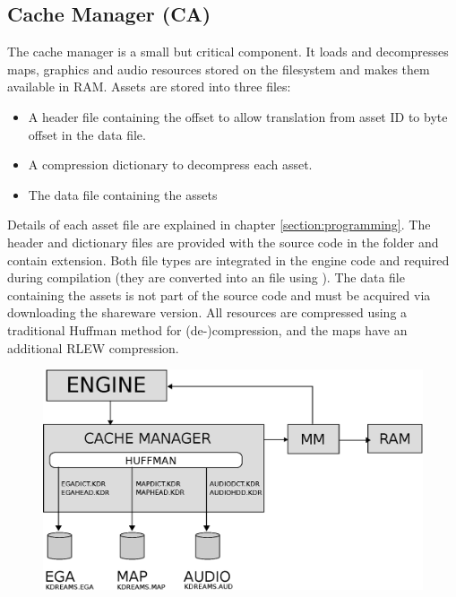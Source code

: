 \documentclass[book.tex]{subfiles}
\begin{document}
\pagebreak

\subsection{Cache Manager (CA)}
The cache manager is a small but critical component. It loads and decompresses maps, graphics and audio resources stored on the filesystem and makes them available in RAM. Assets are stored into three files: 
\begin{itemize}
	\item A header file containing the offset to allow translation from asset ID to byte offset in the data file.
	\item A compression dictionary to decompress each asset.
	\item The data file containing the assets
\end{itemize}
 \par
 
Details of each asset file are explained in chapter \ref{section:programming}. The header and dictionary files are provided with the source code in the  folder and contain  extension. Both file types are integrated in the engine code and required during compilation (they are converted into an  file using ). The data file containing the assets is not part of the source code and must be acquired via downloading the shareware version.
 All resources are compressed using a traditional Huffman method for (de-)compression, and the maps have an additional RLEW compression. \\
 \par
\begin{figure}[H]
\centering
 \includegraphics[width=\textwidth]{imgs/drawings/cache_manager_architecture.eps}
 \end{figure}
\pagebreak
\end{document}
